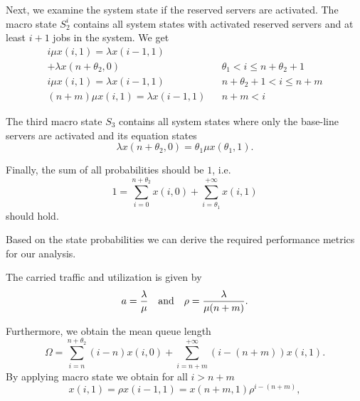 Next, we examine the system state if the reserved servers are activated.
The macro state \(S_2^i\) contains all system states with activated reserved servers and at least \(i+1\) jobs in the system.
We get
\begin{align}
i\mu x(i,1) = \lambda x(i-1,1)\nonumber\\
 + \lambda x(n+\theta_2,0) && \theta_1<i\leq n+\theta_2+1\label{eq:cloud:data_centers:modeling:energy_efficient:S2_1}\\
 i\mu x(i,1) = \lambda  x(i-1,1) && n+\theta_2+1<i\leq n+m\label{eq:cloud:data_centers:modeling:energy_efficient:S2_2}\\
 (n+m)\mu x(i,1) =\lambda x(i-1,1) && n+m<i\label{eq:cloud:data_centers:modeling:energy_efficient:S2_3}
\end{align}

The third macro state \(S_3\) contains all system states where only the base-line servers are activated and its equation states
\begin{equation}
\lambda x(n+\theta_2,0) = \theta_1\mu x(\theta_1,1)\label{eq:cloud:data_centers:modeling:energy_efficient:S3}.
\end{equation}

Finally, the sum of all probabilities should be \(1\), i.e.
\begin{equation}
1=\sum_{i=0}^{n+\theta_2} x(i,0)+\sum_{i=\theta_1}^{+\infty}x(i,1)\label{eq:cloud:data_centers:modeling:normative}
\end{equation}
should hold.

Based on the state probabilities we can derive the required performance metrics for our analysis.

The carried traffic and utilization is given by
\begin{equation*}
a = \frac{\lambda}{\mu} \text{\quad and\quad} \rho=\frac{\lambda}{\mu(n+m)}.
\end{equation*}

Furthermore, we obtain the mean queue length
\begin{equation*}
\Omega = \sum_{i=n}^{n+\theta_2} (i-n)x(i,0) + \sum_{i=n+m}^{+\infty} (i-(n+m))x(i,1).
\end{equation*}
By applying macro state  we obtain for all \(i>n+m\)
\begin{equation}
x(i,1) = \rho x(i-1,1) = x(n + m,1)\rho^{i-(n+m)},
\label{eq:cloud:data_centers:modeling:x_i_redefinition}
\end{equation} 

